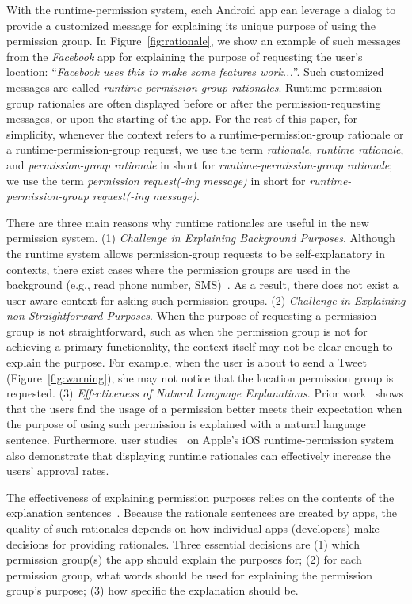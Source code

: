 With the runtime-permission system, each Android app can leverage a dialog to provide a customized message for explaining its unique purpose of using the permission group.
In Figure~\ref{fig:rationale}, we show an example of such messages from the \emph{Facebook} app for explaining the purpose of requesting the user's location: ``\emph{Facebook uses this to make some features work...}''. 
Such customized messages are called \emph{runtime-permission-group rationales}. 
Runtime-permission-group rationales are often displayed before or after the permission-requesting messages, or upon the starting of the app. For the rest of this paper, for simplicity, whenever the context refers to a runtime-permission-group rationale or a runtime-permission-group request, we use the term \emph{rationale}, \emph{runtime rationale}, and \emph{permission-group rationale} in short for \emph{runtime-permission-group rationale}; we use the term \emph{permission request(-ing message)} in short for \emph{runtime-permission-group request(-ing message)}.

There are three main reasons why runtime rationales are useful in the new permission system. 
(1) \emph{Challenge in Explaining Background Purposes}. 
Although the runtime system allows permission-group requests to be self-explanatory in contexts, there exist cases where the permission groups are used in the background (e.g., read phone number, SMS)~\cite{Micinski2017UserIA}. 
As a result, there does not exist a user-aware context for asking such permission groups.
(2) \emph{Challenge in Explaining non-Straightforward Purposes}. 
When the purpose of requesting a permission group is not straightforward, such as when the permission group is not for achieving a  primary functionality, the context itself may not be clear enough to explain the purpose. 
For example, when the user is about to send a Tweet (Figure~\ref{fig:warning}), she may not notice that the location permission group is requested. 
(3) \emph{Effectiveness of Natural Language Explanations}. 
Prior work~\cite{conf/huc/LinSALHZ12} shows that the users find the usage of a permission better meets their expectation when the purpose of using such permission is explained with a natural language sentence. Furthermore, user studies~\cite{conf/chi/TanNTNTEW14} on Apple's iOS runtime-permission system also demonstrate that displaying runtime rationales can effectively increase the users' approval rates. 

The effectiveness of explaining permission purposes relies on the contents of the explanation sentences~\cite{conf/huc/LinSALHZ12}. 
Because the rationale sentences are created by apps, the quality of such rationales depends on how individual apps (developers) make decisions for providing rationales. 
Three essential decisions are  (1) which permission group(s) the app should explain the purposes for; (2) for each permission group, what words should be used for explaining the permission group's purpose; (3) how specific the explanation should be.

